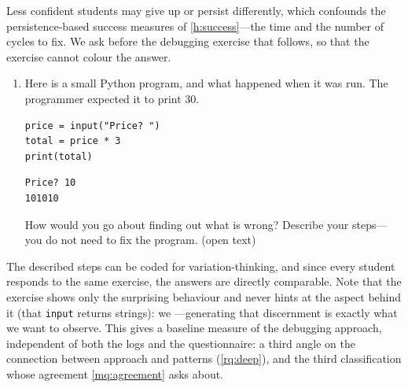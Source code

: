 Less confident students may give up or persist differently, which
confounds the persistence-based success measures of
\cref{h:success}---the time and the number of cycles to fix.
We ask before the debugging exercise that follows, so that the exercise
cannot colour the answer.
\begin{enumerate}[resume]
  \item Here is a small Python program, and what happened when
    it was run.
    The programmer expected it to print 30.
\begin{verbatim}
price = input("Price? ")
total = price * 3
print(total)
\end{verbatim}
\begin{verbatim}
Price? 10
101010
\end{verbatim}
    How would you go about finding out what is wrong?
    Describe your steps---you do not need to fix the program.
    (open text)
\end{enumerate}
The described steps can be coded for variation-thinking, and since
every student responds to the same exercise, the answers are directly
comparable.
Note that the exercise shows only the surprising behaviour and never
hints at the aspect behind it (that \texttt{input} returns
strings): we ---generating that discernment is exactly what we want to
observe.
This gives a baseline measure of the debugging approach, independent of
both the logs and the questionnaire: a third angle on the connection
between approach and patterns (\cref{rq:deep}), and the third
classification whose agreement \cref{mq:agreement} asks about.

